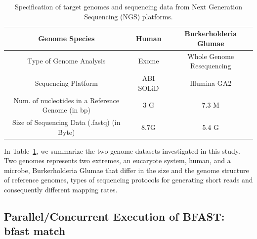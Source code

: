 \documentclass[12pt]{article}
\begin{document}
\begin{table}
\begin{tabular}{|c|cc|} 
  \hline 
  Genome Species & Human  & Burkerholderia Glumae  \\ \hline
  Type of Genome Analysis &  Exome  & Whole Genome Resequencing \\
  Sequencing Platform & ABI SOLiD  &  Illumina GA2 \\
  Num. of nucleotides in a Reference Genome (in bp) &  3 G & 7.3 M \\
  Size of Sequencing Data (.fastq) (in Byte) & 8.7G & 5.4 G \\

\hline
\end{tabular} \caption{Specification of target genomes and sequencing data from Next Generation Sequencing (NGS) platforms.}
 \label{table:two-genomes} 
\end{table}


In Table~\ref{table:two-genomes}, we summarize the two genome datasets investigated in this study. Two genomes represents two extremes, an eucaryote system, human, and a microbe, Burkerholderia Glumae\cite{kim2011} that differ in the size and the genome structure of reference genomes, types of sequencing protocols for generating short reads and consequently different mapping rates.



\subsection{Parallel/Concurrent Execution of BFAST: bfast match}
\end{document}

